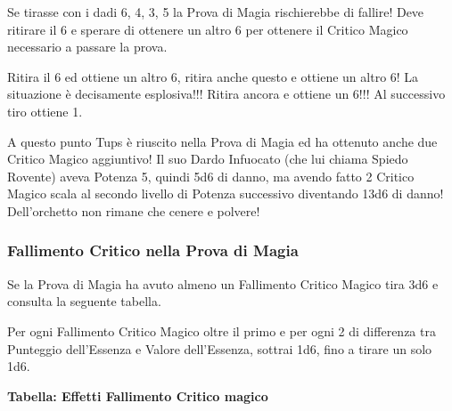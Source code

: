\documentclass[a4paper,twoside,openany]{book}
\begin{document}
\begin{multicols}{2}
Se tirasse con i dadi 6, 4, 3, 5 la Prova di Magia rischierebbe di fallire! Deve ritirare il 6 e sperare di ottenere un altro 6 per ottenere il Critico Magico necessario a passare la prova.

Ritira il 6 ed ottiene un altro 6, ritira anche questo e ottiene un altro 6! La situazione è decisamente esplosiva!!! Ritira ancora e ottiene un 6!!! Al successivo tiro ottiene 1.

A questo punto Tups è riuscito nella Prova di Magia ed ha ottenuto anche due Critico Magico aggiuntivo! Il suo Dardo Infuocato (che lui chiama Spiedo Rovente) aveva Potenza 5, quindi 5d6 di danno, ma avendo fatto 2 Critico Magico scala al secondo livello di Potenza successivo diventando 13d6 di danno!
Dell'orchetto non rimane che cenere e polvere!


\subsubsection{Fallimento Critico nella Prova di Magia}\label{magiefallimentocriticonellaprovadimagia}

Se la Prova di Magia ha avuto almeno un Fallimento Critico Magico tira 3d6 e consulta la seguente tabella. 

Per ogni Fallimento Critico Magico oltre il primo e per ogni 2 di differenza tra Punteggio dell'Essenza e Valore dell'Essenza, sottrai 1d6, fino a tirare un solo 1d6. 


\textbf{Tabella: Effetti Fallimento Critico magico}


\end{multicols}
\end{document}
